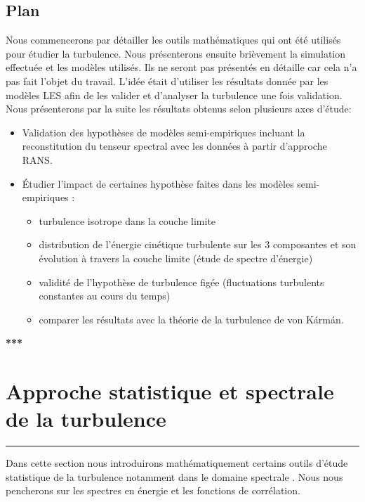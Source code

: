 \documentclass[12pt]{article}   %
\theoremstyle{plain}
\theoremstyle{remark}
\begin{document}
	\subsection{Plan}
	Nous commencerons par détailler les outils mathématiques qui ont été utilisés pour étudier la turbulence. Nous présenterons ensuite brièvement la simulation effectuée et les modèles utilisés. Ils ne seront pas présentés en détaille car cela n'a pas fait l'objet du travail. L'idée était d'utiliser les résultats donnée par les modèles LES afin de les valider et d'analyser la turbulence une fois validation. Nous présenterons par la suite les résultats obtenus selon plusieurs axes d'étude: 
	\begin{itemize}
		\item Validation des hypothèses de modèles semi-empiriques incluant la reconstitution du tenseur spectral avec les données à partir d'approche RANS.
		\item Étudier l'impact de certaines hypothèse faites dans les modèles semi-empiriques : 
		\begin{itemize}
			\item turbulence isotrope dans la couche limite
			\item distribution de l'énergie cinétique turbulente sur les 3 composantes et son évolution à travers la couche limite (étude de spectre d'énergie)
			\item validité de l'hypothèse de turbulence figée (fluctuations turbulents constantes au cours du temps)
			\item comparer les résultats avec la théorie de la turbulence de von Kármán.
		\end{itemize}
	\end{itemize}

\begin{center}
	\large {\bf{***}}
\end{center}

\vspace{0.3cm}
\section{Approche statistique et spectrale de la turbulence}
\noindent\rule{\linewidth}{2pt}
\vspace{0.1cm}

	Dans cette section nous introduirons mathématiquement certains outils d'étude statistique de la turbulence notamment dans le domaine spectrale \cite{mathieu2000introduction}. Nous nous pencherons sur les spectres en énergie et les fonctions de corrélation.
	
\end{document}
